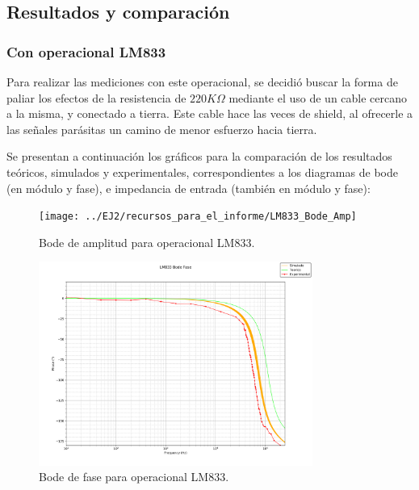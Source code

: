 \subsection{Resultados y comparación}
\subsubsection{Con operacional LM833}
Para realizar las mediciones con este operacional, se decidió buscar la forma de paliar los efectos de la resistencia de $220K\Omega$ mediante el uso de un cable cercano a la misma, y conectado a tierra.
Este cable hace las veces de shield, al ofrecerle a las señales parásitas un camino de menor esfuerzo hacia tierra. \par
Se presentan a continuación los gráficos para la comparación de los resultados teóricos, simulados y experimentales, correspondientes a los diagramas de bode (en módulo y fase), e impedancia de entrada (también en módulo y fase):
\begin{figure}[H]
    \begin{minipage}{\textwidth}
        \centering
        \texttt{[image: ../EJ2/recursos\_para\_el\_informe/LM833\_Bode\_Amp]}
        \caption{Bode de amplitud para operacional LM833.}
        \label{fig:LM833_Bode_Amp}
    \end{minipage}\hfill
\end{figure}
\begin{figure}[H]
    \begin{minipage}{\textwidth}
        \centering
        \includegraphics[width=0.8\textwidth]{../EJ2/recursos_para_el_informe/LM833_Bode_Fase}
        \caption{Bode de fase para operacional LM833.}
        \label{fig:LM833_Bode_Fase}
    \end{minipage}\hfill
\end{figure}

